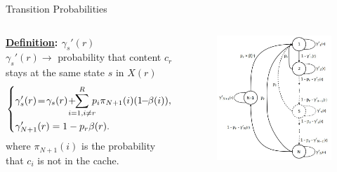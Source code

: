 \documentclass[
	xcolor={svgnames},
	hyperref={pagebackref,bookmarks},
	aspectratio=43,
]{beamer}
\begin{document}
\begin{frame}{Transition Probabilities}
    \begin{columns}
        \textbf{\underline{Definition}: \boldmath$\gamma_s'(r)$} \\ \vspace*{1mm}
            $\gamma_s'(r) \rightarrow$ probability that content $c_r$ stays at the same state $s$ in $X(r)$
            \begin{equation}
                \begin{dcases*}
                    \gamma_s'(r)\! =\! \gamma_s(r)\! + \mkern-18mu \sum_{i = 1, i \neq r}^{R}\mkern-10mu p_i \pi_{N+1}(i)(1\!\! -\!\! \beta(i)), \\
                    \gamma_{N+1}'(r) = 1 - p_r\beta(r).
                \end{dcases*}
            \end{equation}
            where $\pi_{N+1}(i)$ is the probability that $c_i$ is not in the cache.
        \begin{figure}
            \centering
            \includegraphics[scale=0.25]{macs.jpeg}
        \end{figure}
    \end{columns}
\end{frame}
\end{document}
